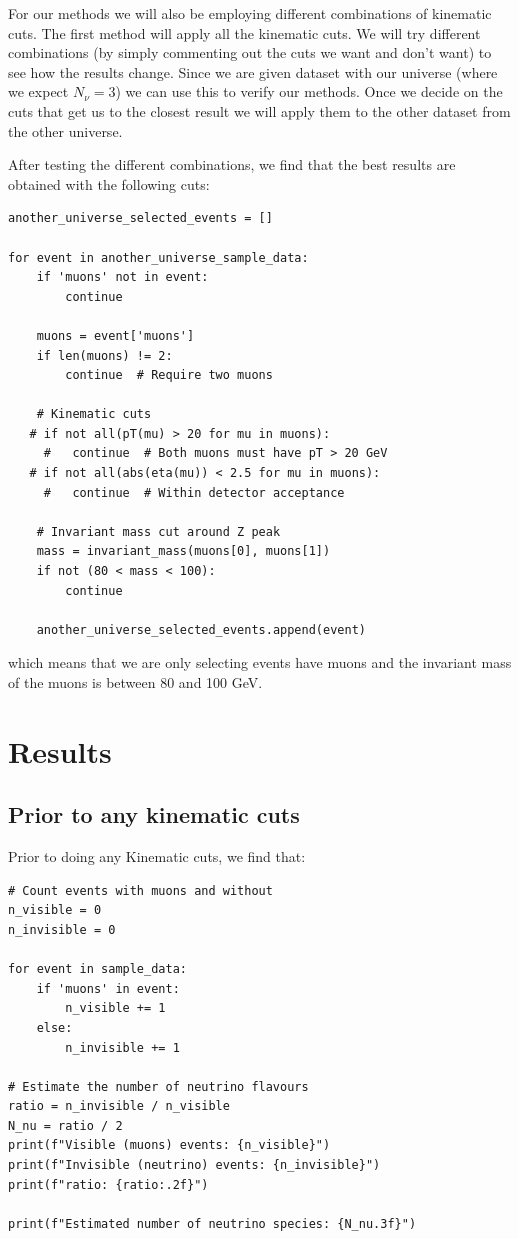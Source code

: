 For our methods we will also be employing different combinations of kinematic cuts. The first method will apply all the kinematic cuts. We will try different combinations (by simply commenting out the cuts we want and don't want) to see how the results change. Since we are given dataset with our universe (where we expect $N_{\nu} = 3$) we can use this to verify our methods. Once we decide on the cuts that get us to the closest result we will apply them to the other dataset from the other universe. 

After testing the different combinations, we find that the best results are obtained with the following cuts:
\begin{lstlisting}
another_universe_selected_events = []

for event in another_universe_sample_data:
    if 'muons' not in event:
        continue

    muons = event['muons']
    if len(muons) != 2:
        continue  # Require two muons

    # Kinematic cuts
   # if not all(pT(mu) > 20 for mu in muons):
     #   continue  # Both muons must have pT > 20 GeV
   # if not all(abs(eta(mu)) < 2.5 for mu in muons):
     #   continue  # Within detector acceptance

    # Invariant mass cut around Z peak
    mass = invariant_mass(muons[0], muons[1])
    if not (80 < mass < 100):
        continue

    another_universe_selected_events.append(event)
\end{lstlisting}
which means that we are only selecting events have muons and the invariant mass of the muons is between 80 and 100 GeV.
\section{Results}
\subsection{Prior to any kinematic cuts}
Prior to doing any Kinematic cuts, we find that: 
\begin{lstlisting}
# Count events with muons and without
n_visible = 0
n_invisible = 0

for event in sample_data:
    if 'muons' in event:
        n_visible += 1
    else:
        n_invisible += 1

# Estimate the number of neutrino flavours
ratio = n_invisible / n_visible
N_nu = ratio / 2
print(f"Visible (muons) events: {n_visible}")
print(f"Invisible (neutrino) events: {n_invisible}")
print(f"ratio: {ratio:.2f}")

print(f"Estimated number of neutrino species: {N_nu.3f}")
        \end{lstlisting}

